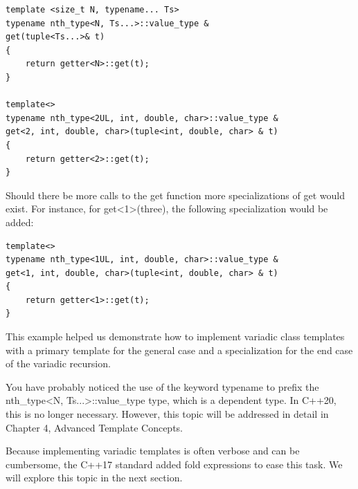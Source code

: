 \begin{lstlisting}[style=styleCXX]
template <size_t N, typename... Ts>
typename nth_type<N, Ts...>::value_type &
get(tuple<Ts...>& t)
{
	return getter<N>::get(t);
}

template<>
typename nth_type<2UL, int, double, char>::value_type &
get<2, int, double, char>(tuple<int, double, char> & t)
{
	return getter<2>::get(t);
}
\end{lstlisting}

Should there be more calls to the get function more specializations of get would exist. For instance, for get<1>(three), the following specialization would be added:

\begin{lstlisting}[style=styleCXX]
template<>
typename nth_type<1UL, int, double, char>::value_type &
get<1, int, double, char>(tuple<int, double, char> & t)
{
	return getter<1>::get(t);
}
\end{lstlisting}

This example helped us demonstrate how to implement variadic class templates with a primary template for the general case and a specialization for the end case of the variadic recursion.

You have probably noticed the use of the keyword typename to prefix the nth\_type<N, Ts...>::value\_type type, which is a dependent type. In C++20, this is no longer necessary. However, this topic will be addressed in detail in Chapter 4, Advanced Template Concepts.

Because implementing variadic templates is often verbose and can be cumbersome, the C++17 standard added fold expressions to ease this task. We will explore this topic in the next section.


